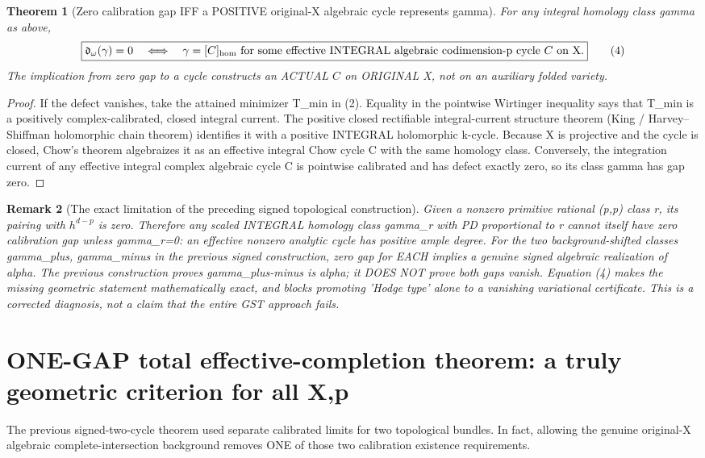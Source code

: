 \documentclass[11pt]{article}
\newtheorem{theorem}{Theorem}[section]
\newtheorem{remark}[theorem]{Remark}
\begin{document}
\begin{theorem}[Zero calibration gap IFF a POSITIVE original-X algebraic cycle represents gamma]
For any integral homology class gamma as above,
\[
 \boxed{
 \mathfrak d_\omega(\gamma)=0
 \quad\Longleftrightarrow\quad
 \gamma=[C]_{\rm hom}
 \text{ for some effective INTEGRAL
 algebraic codimension-p cycle }C\text{ on X}.
 }                                                       \tag{4}
\]
The implication from zero gap to a cycle
constructs an ACTUAL \(C\) on ORIGINAL X,
not on an auxiliary folded variety.
\end{theorem}
\begin{proof}
If the defect vanishes, take the attained
minimizer T_min in (2).
Equality in the pointwise Wirtinger inequality
says that T_min is a positively
complex-calibrated, closed integral current.
The positive closed rectifiable integral-current
structure theorem (King / Harvey--Shiffman
holomorphic chain theorem) identifies it with
a positive INTEGRAL holomorphic k-cycle.
Because X is projective and the cycle is closed,
Chow's theorem algebraizes it as an effective
integral Chow cycle C with the same homology class.
Conversely, the integration current of any
effective integral complex algebraic cycle C
is pointwise calibrated and has defect exactly
zero, so its class gamma has gap zero.
\end{proof}

\begin{remark}[The exact limitation of the preceding signed topological construction]
Given a nonzero primitive rational (p,p) class r,
its pairing with \(h^{d-p}\) is zero.
Therefore any scaled INTEGRAL homology
class gamma_r with PD proportional to r
cannot itself have zero calibration gap
unless gamma_r=0: an effective nonzero
analytic cycle has positive ample degree.
For the two background-shifted
classes gamma_plus, gamma_minus in the
previous signed construction,
zero gap for EACH implies a genuine
signed algebraic realization of alpha.
The previous construction proves
gamma_plus-minus is alpha;
it DOES NOT prove both gaps vanish.
Equation (4) makes the missing
geometric statement mathematically exact,
and blocks promoting 'Hodge type' alone
to a vanishing variational certificate.
This is a corrected diagnosis,
not a claim that the entire GST approach fails.
\end{remark}

\section{ONE-GAP total effective-completion theorem: a truly geometric criterion for all X,p}
The previous signed-two-cycle theorem used
separate calibrated limits for two
topological bundles. In fact, allowing
the genuine original-X algebraic
complete-intersection background
removes ONE of those two
calibration existence requirements.
\end{document}
